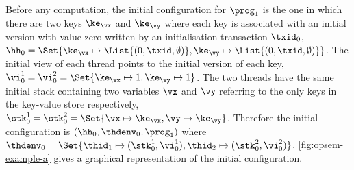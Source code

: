 Before any computation, the initial configuration for $\prog_1$ is the one in which there are two keys \( \ke_{\vx}\) and \( \ke_{\vy} \) where each key is associated with an initial version with value zero written by an initialisation transaction $\txid_0$, \( \hh_{0} = \Set{\ke_{\vx} \mapsto \List{(0, \txid, \emptyset)}, \ke_{\vy} \mapsto \List{(0, \txid, \emptyset)}} \).
The initial view of each thread points to the initial version of each key, \( \vi^{1}_{0} = \vi^{2}_{0} = \Set{\ke_{\vx} \mapsto 1, \ke_{\vy} \mapsto 1}\).
The two threads have the same initial stack containing two variables \( \vx \) and \( \vy \) referring to the only keys in the key-value store respectively, \ie \( \stk^{1}_{0} = \stk^{2}_{0} = \Set{\vx \mapsto \ke_{\vx}, \vy \mapsto \ke_{\vy}}\).
Therefore the initial configuration is \( (\hh_{0}, \thdenv_{0}, \prog_{1}) \) where \( \thdenv_{0} = \Set{\thid_{1} \mapsto (\stk_{0}^{1}, \vi_{0}^{1}), \thid_{2} \mapsto (\stk_{0}^{2}, \vi_{0}^{2})}\).
\cref{fig:opsem-example-a} gives a graphical representation of the initial configuration.
 


